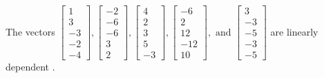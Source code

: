 \begin{exercise}
\begin{exerciseStatement}
  \end{exerciseStatement}
  \begin{exerciseAnswer}
   The vectors \(\left[\begin{array}{r}
1 \\
3 \\
-3 \\
-2 \\
-4
\end{array}\right] , \left[\begin{array}{r}
-2 \\
-6 \\
-6 \\
3 \\
2
\end{array}\right] , \left[\begin{array}{r}
4 \\
2 \\
3 \\
5 \\
-3
\end{array}\right] , \left[\begin{array}{r}
-6 \\
2 \\
12 \\
-12 \\
10
\end{array}\right] , \text{ and } \left[\begin{array}{r}
3 \\
-3 \\
-5 \\
-3 \\
-5
\end{array}\right]\) are 
  	 linearly dependent  .
  


  \end{exerciseAnswer}
\end{exercise}